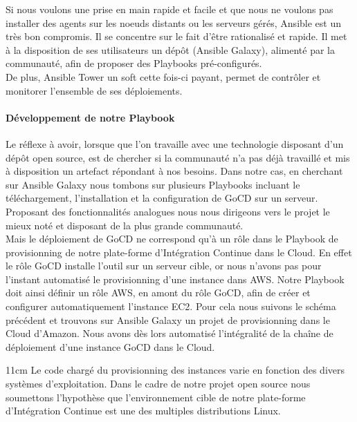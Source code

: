          Si nous voulons une prise en main rapide et facile et que nous ne voulons pas installer des agents sur les noeuds distants ou les serveurs gérés, Ansible est un très bon compromis. Il se concentre sur le fait d'être rationalisé et rapide. Il met à la disposition de ses utilisateurs un dépôt (Ansible Galaxy), alimenté par la communauté, afin de proposer des Playbooks pré-configurés.\\

          De plus, Ansible Tower un soft cette fois-ci payant, permet de contrôler et monitorer l'ensemble de ses déploiements.

          \paragraph{Développement de notre Playbook}
          Le réflexe à avoir, lorsque que l'on travaille avec une technologie disposant d'un dépôt open source, est de chercher si la communauté n'a pas déjà travaillé et mis à disposition un artefact répondant à nos besoins. Dans notre cas, en cherchant sur Ansible Galaxy nous tombons sur plusieurs Playbooks incluant le téléchargement, l'installation et la configuration de GoCD sur un serveur. Proposant des fonctionnalités analogues nous nous dirigeons vers le projet le mieux noté et disposant de la plus grande communauté.\\

          Mais le déploiement de GoCD ne correspond qu'à un rôle dans le Playbook de provisionning de notre plate-forme d'Intégration Continue dans le Cloud. En effet le rôle GoCD installe l'outil sur un serveur cible, or nous n'avons pas pour l'instant automatisé le provisionning d'une instance dans AWS. Notre Playbook doit ainsi définir un rôle AWS, en amont du rôle GoCD, afin de créer et configurer automatiquement l'instance EC2. Pour cela nous suivons le schéma précédent et trouvons sur Ansible Galaxy un projet de provisionning dans le Cloud d'Amazon. Nous avons dès lors automatisé l'intégralité de la chaîne de déploiement d'une instance GoCD dans le Cloud.\\

          \begin {boxedminipage} {11cm}
            Le code chargé du provisionning des instances varie en fonction des divers systèmes d'exploitation. Dans le cadre de notre projet open source nous soumettons l'hypothèse que l'environnement cible de notre plate-forme d'Intégration Continue est une des multiples distributions Linux.
          \end {boxedminipage}\\

